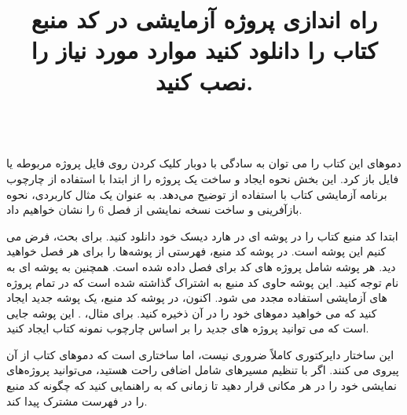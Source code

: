 \title{
    \LARGE
    \textbf{راه اندازی پروژه آزمایشی در }
}
\\[25pt] %
{\large
دموهای این کتاب را می توان به سادگی با دوبار کلیک کردن روی فایل پروژه مربوطه  یا فایل  باز کرد.
این بخش نحوه ایجاد و ساخت یک پروژه را از ابتدا با استفاده از چارچوب برنامه آزمایشی کتاب با استفاده از  توضیح می‌دهد.
به عنوان یک مثال کاربردی، نحوه بازآفرینی و ساخت نسخه نمایشی  از فصل 6 را نشان خواهیم داد.
} %

\title{
    \Large
    \textbf{کد منبع کتاب را دانلود کنید}
}

{\large
ابتدا کد منبع کتاب را در پوشه ای در هارد دیسک خود دانلود کنید.
برای بحث، فرض می کنیم این پوشه  است.
در پوشه کد منبع، فهرستی از پوشه‌ها را برای هر فصل خواهید دید. هر پوشه شامل پروژه های کد برای فصل داده شده است.
همچنین به پوشه ای به نام  توجه کنید. این پوشه حاوی کد منبع به اشتراک گذاشته شده است که در تمام پروژه های آزمایشی استفاده مجدد می شود.
اکنون، در پوشه کد منبع، یک پوشه جدید ایجاد کنید که می خواهید دموهای خود را در آن ذخیره کنید. برای مثال، . این پوشه جایی است که می توانید پروژه های جدید را بر اساس چارچوب نمونه کتاب ایجاد کنید.

این ساختار دایرکتوری کاملاً ضروری نیست، اما ساختاری است که دموهای کتاب از آن پیروی می کنند. اگر با تنظیم مسیرهای شامل اضافی راحت هستید، می‌توانید پروژه‌های نمایشی خود را در هر مکانی قرار دهید تا زمانی که به  راهنمایی کنید که چگونه کد منبع را در فهرست مشترک پیدا کند.
} %

\title{
    \Large
    \textbf{موارد مورد نیاز  را نصب کنید.}
}

